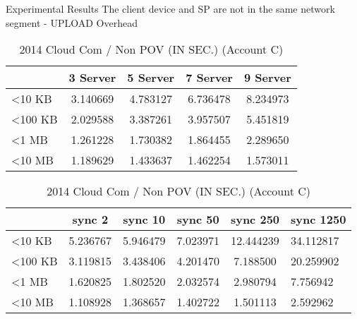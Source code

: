\begin{frame}{Experimental Results}
{The client device and SP are \alert{not} in the same network segment - UPLOAD Overhead}
	\scriptsize
    \begin{table}[]
    \centering
    \caption{My Method / Non POV (IN SEC.) (Account C)}
    \begin{tabular}{lcccc}
                         & 3 Server & 5 Server & 7 Server & 9 Server \\ \hline
        \textless 10 KB  & 3.140669 & 4.783127 & 6.736478 & 8.234973 \\ \hline
        \textless 100 KB & 2.029588 & 3.387261 & 3.957507 & 5.451819 \\ \hline
        \textless 1 MB   & 1.261228 & 1.730382 & 1.864455 & 2.289650 \\ \hline
        \textless 10 MB  & 1.189629 & 1.433637 & 1.462254 & 1.573011 \\ \hline
    \end{tabular}
    \caption{2014 Cloud Com / Non POV (IN SEC.) (Account C)}
    \begin{tabular}{lccccl}
                         & sync 2   & sync 10  & sync 50  & sync 250  & sync 1250 \\ \hline
        \textless 10 KB  & 5.236767 & 5.946479 & 7.023971 & 12.444239 & 34.112817 \\ \hline
        \textless 100 KB & 3.119815 & 3.438406 & 4.201470 & 7.188500  & 20.259902 \\ \hline
        \textless 1 MB   & 1.620825 & 1.802520 & 2.032574 & 2.980794  & 7.756942  \\ \hline
        \textless 10 MB  & 1.108928 & 1.368657 & 1.402722 & 1.501113  & 2.592962  \\ \hline
    \end{tabular}
    \end{table}
\end{frame}

